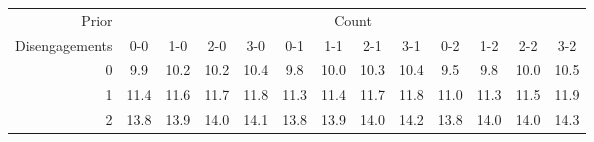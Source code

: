 \begin{tabular}{r|cccc|cccc|cccc}
Prior & \multicolumn{12}{c}{Count}\\
Disengagements & 0-0 & 1-0 & 2-0 & 3-0 & 0-1 & 1-1 & 2-1 & 3-1 & 0-2 & 1-2 & 2-2 & 3-2 \\
  \hline
0 & 9.9 & 10.2 & 10.2 & 10.4 & 9.8 & 10.0 & 10.3 & 10.4 & 9.5 & 9.8 & 10.0 & 10.5 \\ 
  1 & 11.4 & 11.6 & 11.7 & 11.8 & 11.3 & 11.4 & 11.7 & 11.8 & 11.0 & 11.3 & 11.5 & 11.9 \\ 
  2 & 13.8 & 13.9 & 14.0 & 14.1 & 13.8 & 13.9 & 14.0 & 14.2 & 13.8 & 14.0 & 14.0 & 14.3 \\ 
\end{tabular}
